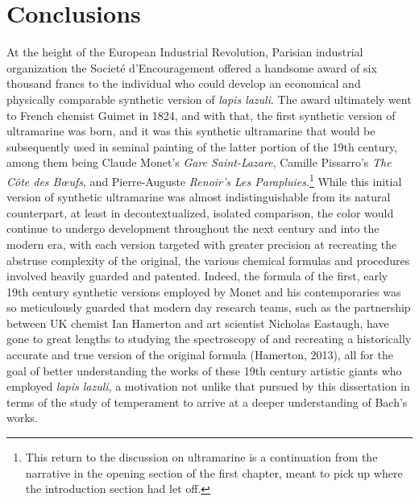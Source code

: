     
    
    

    \hypertarget{Conclusions}{\chapter{Conclusions}\label{Conclusions}}
    At the height of the European Industrial Revolution, Parisian industrial
organization the Societé d'Encouragement offered a handsome award of six
thousand francs to the individual who could develop an economical and
physically comparable synthetic version of \emph{lapis lazuli}. The
award ultimately went to French chemist Guimet in 1824, and with that,
the first synthetic version of ultramarine was born, and it was this
synthetic ultramarine that would be subsequently used in seminal
painting of the latter portion of the 19th century, among them being
Claude Monet's \emph{Gare Saint-Lazare}, Camille Pissarro's \emph{The
Côte des Bœufs}, and Pierre-Auguste \emph{Renoir's Les
Parapluies}.\footnote{This return to the discussion on ultramarine is a continuation from the narrative in the opening section of the first chapter, meant to pick up where the introduction section had let off.}
While this initial version of synthetic ultramarine was almost
indistinguishable from its natural counterpart, at least in
decontextualized, isolated comparison, the color would continue to
undergo development throughout the next century and into the modern era,
with each version targeted with greater precision at recreating the
abstruse complexity of the original, the various chemical formulas and
procedures involved heavily guarded and patented. Indeed, the formula of
the first, early 19th century synthetic versions employed by Monet and
his contemporaries was so meticulously guarded that modern day research
teams, such as the partnership between UK chemist Ian Hamerton and art
scientist Nicholas Eastaugh, have gone to great lengths to studying the
spectroscopy of and recreating a historically accurate and true version
of the original formula (Hamerton, 2013), all for the goal of better
understanding the works of these 19th century artistic giants who
employed \emph{lapis lazuli}, a motivation not unlike that pursued by
this dissertation in terms of the study of temperament to arrive at a
deeper understanding of Bach's works.

